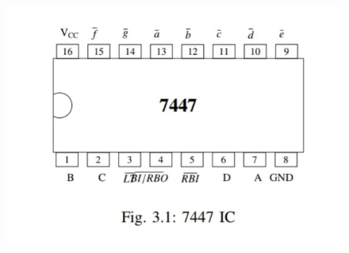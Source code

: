 \documentclass[a4paper,12pt]{article}
\begin{document}
\begin{figure}[h]
    \centering
    \begin{minipage}{0.48\textwidth}
        \centering
        \includegraphics[width=\textwidth]{figs/7447.jpeg} 
    \end{minipage}
    \hfill
    \begin{minipage}{0.48\textwidth}
        \centering

\end{minipage}
\end{figure}
\end{document}
